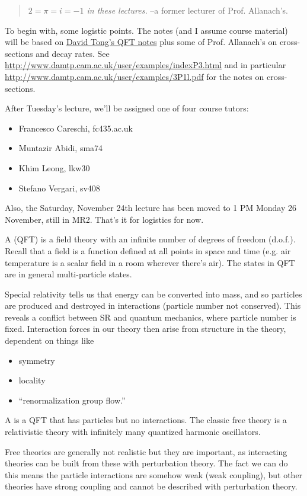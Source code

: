 \begin{quote}\textit{$2=\pi=i=-1$ in these lectures.} --a former lecturer of Prof. Allanach's.\end{quote}
To begin with, some logistic points. The notes (and I assume course material) will be based on \href{http://www.damtp.cam.ac.uk/user/tong/qft/qft.pdf}{David Tong's QFT notes} plus some of Prof. Allanach's on cross-sections and decay rates. See \url{http://www.damtp.cam.ac.uk/user/examples/indexP3.html} and in particular \url{http://www.damtp.cam.ac.uk/user/examples/3P1l.pdf} for the notes on cross-sections.

After Tuesday's lecture, we'll be assigned one of four course tutors:
\begin{itemize}
    \item Francesco Careschi, fc435\@cam.ac.uk
    \item Muntazir Abidi, sma74
    \item Khim Leong, lkw30
    \item Stefano Vergari, sv408
\end{itemize}
Also, the Saturday, November 24th lecture has been moved to 1 PM Monday 26 November, still in MR2. That's it for logistics for now.

\begin{defn}
A  (QFT) is a field theory with an infinite number of degrees of freedom (d.o.f.). Recall that a field is a function defined at all points in space and time (e.g. air temperature is a scalar field in a room wherever there's air). The states in QFT are in general multi-particle states.
\end{defn}
Special relativity tells us that energy can be converted into mass, and so particles are produced and destroyed in interactions (particle number not conserved). This reveals a conflict between SR and quantum mechanics, where particle number is fixed. Interaction forces in our theory then arise from structure in the theory, dependent on things like
\begin{itemize}
    \item symmetry
    \item locality
    \item ``renormalization group flow.''
\end{itemize}

\begin{defn}
A  is a QFT that has particles but no interactions. The classic free theory is a relativistic theory with infinitely many quantized harmonic oscillators.
\end{defn}
Free theories are generally not realistic but they are important, as interacting theories can be built from these with perturbation theory. The fact we can do this means the particle interactions are somehow weak (weak coupling), but other theories have strong coupling and cannot be described with perturbation theory.

